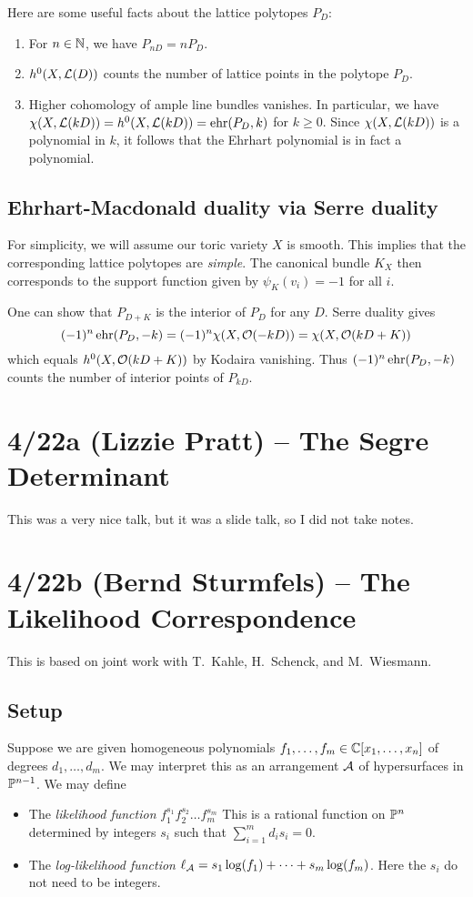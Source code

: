 \documentclass{article}
\begin{document}
Here are some useful facts about the lattice polytopes $P_D$:
\begin{enumerate}
	\item For $n \in \mathbb{N}$, we have $P_{nD} = n P_D$.
	\item $h^0(X, \mathcal{L}(D))$ counts the number of lattice points in the polytope $P_D$.
	\item Higher cohomology of ample line bundles vanishes.
		In particular, we have $\chi(X, \mathcal{L}(kD)) = h^0(X, \mathcal{L}(kD)) = \operatorname{ehr}(P_D, k)$ for $k \geq 0$.
		Since $\chi(X, \mathcal{L}(kD))$ is a polynomial in $k$, it follows that the Ehrhart polynomial is in fact a polynomial.
\end{enumerate}

\subsection{Ehrhart-Macdonald duality via Serre duality}

For simplicity, we will assume our toric variety $X$ is smooth.
This implies that the corresponding lattice polytopes are \emph{simple}.
The canonical bundle $K_X$ then corresponds to the support function given by $\psi_K(v_i) = -1$ for all $i$.

One can show that $P_{D+K}$ is the interior of $P_D$ for any $D$.
Serre duality gives
\[
	(-1)^n \operatorname{ehr}(P_D, -k) = (-1)^n \chi(X, \mathcal{O}(-kD)) = \chi(X, \mathcal{O}(kD + K))
\]
which equals $h^0(X, \mathcal{O}(kD + K))$ by Kodaira vanishing.
Thus $(-1)^n \operatorname{ehr}(P_D, -k)$ counts the number of interior points of $P_{kD}$.

\section{4/22a (Lizzie Pratt) -- The Segre Determinant}

This was a very nice talk, but it was a slide talk, so I did not take notes.

\section{4/22b (Bernd Sturmfels) -- The Likelihood Correspondence}

This is based on joint work with T.\ Kahle, H.\ Schenck, and M.\ Wiesmann.

\subsection{Setup}

Suppose we are given homogeneous polynomials $f_1, \dots, f_m \in \mathbb{C}[x_1, \dots, x_n]$ of degrees $d_1, \dots, d_m$.
We may interpret this as an arrangement $\mathcal{A}$ of hypersurfaces in $\mathbb{P}^{n-1}$.
We may define
\begin{itemize}
	\item The \emph{likelihood function} $f_1^{s_1} f_2^{s_2} \dots f_m^{s_m}$ 
		This is a rational function on $\mathbb{P}^n$ determined by integers $s_i$ such that $\sum_{i=1}^m d_i s_i = 0$.
	\item The \emph{log-likelihood function} $\ell_{\mathcal{A}} = s_1 \log(f_1) + \dots + s_m \log(f_m)$.
		Here the $s_i$ do not need to be integers.
\end{itemize}
\end{document}
